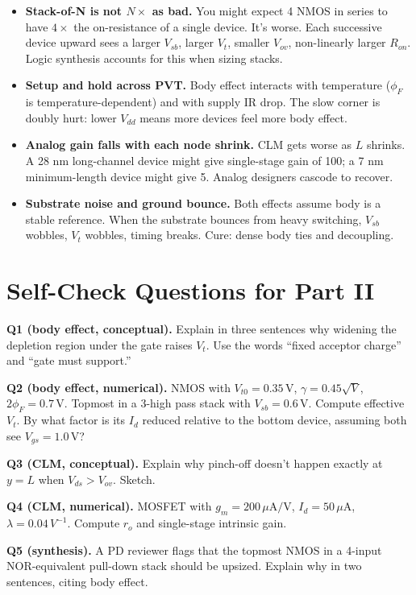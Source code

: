 \documentclass[11pt]{article}
\begin{document}
\begin{itemize}
\item \textbf{Stack-of-N is not $N\times$ as bad.} You might expect 4 NMOS in series to have $4\times$ the on-resistance of a single device. It's worse. Each successive device upward sees a larger $V_{sb}$, larger $V_t$, smaller $V_{ov}$, non-linearly larger $R_{on}$. Logic synthesis accounts for this when sizing stacks.
\item \textbf{Setup and hold across PVT.} Body effect interacts with temperature ($\phi_F$ is temperature-dependent) and with supply IR drop. The slow corner is doubly hurt: lower $V_{dd}$ means more devices feel more body effect.
\item \textbf{Analog gain falls with each node shrink.} CLM gets worse as $L$ shrinks. A 28 nm long-channel device might give single-stage gain of 100; a 7 nm minimum-length device might give 5. Analog designers cascode to recover.
\item \textbf{Substrate noise and ground bounce.} Both effects assume body is a stable reference. When the substrate bounces from heavy switching, $V_{sb}$ wobbles, $V_t$ wobbles, timing breaks. Cure: dense body ties and decoupling.
\end{itemize}

\section{Self-Check Questions for Part II}

\textbf{Q1 (body effect, conceptual).} Explain in three sentences why widening the depletion region under the gate raises $V_t$. Use the words ``fixed acceptor charge'' and ``gate must support.''

\textbf{Q2 (body effect, numerical).} NMOS with $V_{t0} = 0.35\,\text{V}$, $\gamma = 0.45\sqrt{V}$, $2\phi_F = 0.7\,\text{V}$. Topmost in a 3-high pass stack with $V_{sb} = 0.6\,\text{V}$. Compute effective $V_t$. By what factor is its $I_d$ reduced relative to the bottom device, assuming both see $V_{gs} = 1.0\,\text{V}$?

\textbf{Q3 (CLM, conceptual).} Explain why pinch-off doesn't happen exactly at $y = L$ when $V_{ds} > V_{ov}$. Sketch.

\textbf{Q4 (CLM, numerical).} MOSFET with $g_m = 200\,\mu\text{A/V}$, $I_d = 50\,\mu\text{A}$, $\lambda = 0.04\,V^{-1}$. Compute $r_o$ and single-stage intrinsic gain.

\textbf{Q5 (synthesis).} A PD reviewer flags that the topmost NMOS in a 4-input NOR-equivalent pull-down stack should be upsized. Explain why in two sentences, citing body effect.
\end{document}
